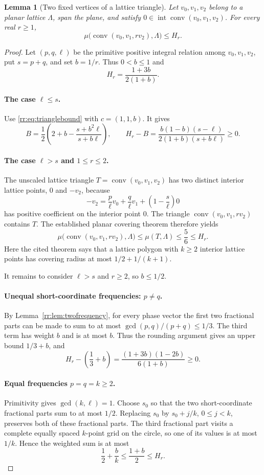\documentclass[11pt,a4paper]{article}
\newtheorem{lemma}[theorem]{Lemma}
\theoremstyle{remark}\newtheorem{remark}[theorem]{Remark}
\DeclareMathOperator{\conv}{conv}
\DeclareMathOperator{\inter}{int}
\begin{document}
\begin{lemma}[Two fixed vertices of a lattice triangle]
\label{rr:lem:triangle}
Let $v_0,v_1,v_2$ belong to a planar lattice $\Lambda$, span the
plane, and satisfy $0\in\inter\conv(v_0,v_1,v_2)$.  For every real
$r\ge1$,
\[
 \mu\bigl(\conv(v_0,v_1,rv_2),\Lambda\bigr)\le H_r.
\]
\end{lemma}
\begin{proof}
Let $(p,q,\ell)$ be the primitive positive integral relation among
$v_0,v_1,v_2$, put $s=p+q$, and set $b=1/r$.  Thus
$0<b\le1$ and
\[
 H_r=\frac{1+3b}{2(1+b)}.
\]

\paragraph{The case $\ell\le s$.}
Use \eqref{rr:eq:trianglebound} with $c=(1,1,b)$.  It gives
\[
 B=\frac12\left(2+b-\frac{s+b^2\ell}{s+b\ell}\right),
 \qquad
 H_r-B=\frac{b(1-b)(s-\ell)}{2(1+b)(s+b\ell)}\ge0.
\]

\paragraph{The case $\ell>s$ and $1\le r\le2$.}
The unscaled lattice triangle $T=\conv(v_0,v_1,v_2)$ has two
distinct interior lattice points, $0$ and $-v_2$, because
\[
 -v_2=\frac p\ell v_0+\frac q\ell v_1+
       \left(1-\frac{s}{\ell}\right)0
\]
has positive coefficient on the interior point $0$.
The triangle $\conv(v_0,v_1,rv_2)$ contains $T$.  The established
planar covering theorem \cite[Theorem 6.3]{CSS} therefore yields
\[
 \mu\bigl(\conv(v_0,v_1,rv_2),\Lambda\bigr)
 \le\mu(T,\Lambda)\le\frac56\le H_r.
\]
Here the cited theorem says that a lattice polygon with $k\ge2$
interior lattice points has covering radius at most
$1/2+1/(k+1)$.

It remains to consider $\ell>s$ and $r\ge2$, so $b\le1/2$.

\paragraph{Unequal short-coordinate frequencies: $p\ne q$.}
By Lemma~\ref{rr:lem:twofrequency}, for every phase vector the
first two fractional parts can be made to sum to at most
$\gcd(p,q)/(p+q)\le1/3$.  The third term has weight $b$ and is at
most $b$.  Thus the rounding argument gives an upper bound
$1/3+b$, and
\[
 H_r-\left(\frac13+b\right)
 =\frac{(1+3b)(1-2b)}{6(1+b)}\ge0.
\]

\paragraph{Equal frequencies $p=q=k\ge2$.}
Primitivity gives $\gcd(k,\ell)=1$.  Choose $s_0$ so that the
two short-coordinate fractional parts sum to at most $1/2$.
Replacing $s_0$ by $s_0+j/k$, $0\le j<k$, preserves both of these
fractional parts.  The third fractional part visits a complete
equally spaced $k$-point grid on the circle, so one of its values
is at most $1/k$.  Hence the weighted sum is at most
\[
 \frac12+\frac bk\le\frac{1+b}{2}\le H_r.
\]


\end{proof}
\end{document}
